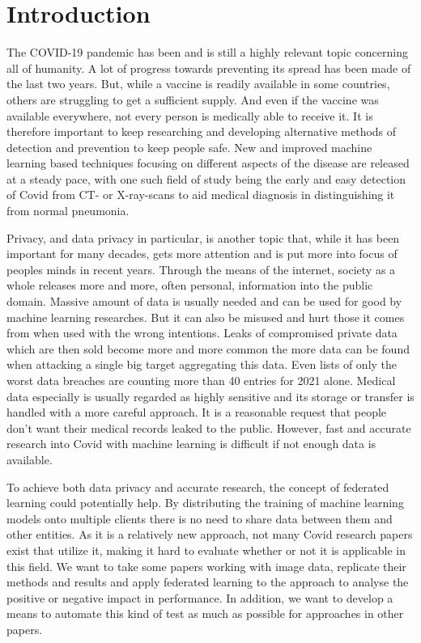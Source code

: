\section{Introduction}

The COVID-19 pandemic has been and is still a highly relevant topic concerning all of humanity. A lot of progress towards preventing its spread has been made of the last two years. But, while a vaccine is readily available in some countries, others are struggling to get a sufficient supply. And even if the vaccine was available everywhere, not every person is medically able to receive it. It is therefore important to keep researching and developing alternative methods of detection and prevention to keep people safe. New and improved machine learning based techniques focusing on different aspects of the disease are released at a steady pace, with one such field of study being the early and easy detection of Covid from CT- or X-ray-scans to aid medical diagnosis in distinguishing it from normal pneumonia.

Privacy, and data privacy in particular, is another topic that, while it has been important for many decades, gets more attention and is put more into focus of peoples minds in recent years. Through the means of the internet, society as a whole releases more and more, often personal, information into the public domain. Massive amount of data is usually needed and can be used for good by machine learning researches. But it can also be misused and hurt those it comes from when used with the wrong intentions. Leaks of compromised private data which are then sold become more and more common the more data can be found when attacking a single big target aggregating this data. Even lists of only the worst data breaches are counting more than 40 entries for 2021 alone.\cite{data_breaches}
Medical data especially is usually regarded as highly sensitive and its storage or transfer is handled with a more careful approach. It is a reasonable request that people don't want their medical records leaked to the public. However, fast and accurate research into Covid with machine learning is difficult if not enough data is available. 

To achieve both data privacy and accurate research, the concept of federated learning could potentially help. By distributing the training of machine learning models onto multiple clients there is no need to share data between them and other entities. As it is a relatively new approach, not many Covid research papers exist that utilize it, making it hard to evaluate whether or not it is applicable in this field. We want to take some papers working with image data, replicate their methods and results and apply federated learning to the approach to analyse the positive or negative impact in performance. In addition, we want to develop a means to automate this kind of test as much as possible for approaches in other papers. 

